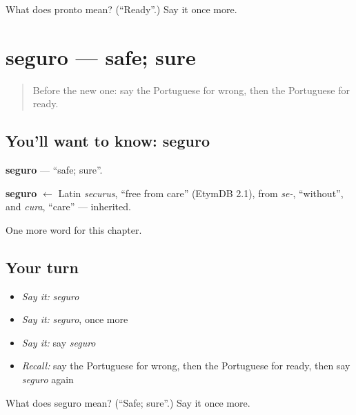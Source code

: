 \begin{tcolorbox}[breakable,colback=teal!4,colframe=teal!35!black,title={Before you move on}]
What does pronto mean? (\textquotedblleft{}Ready\textquotedblright{}.) Say it once more.
\end{tcolorbox}
\section[seguro]{seguro — safe; sure}

\label{lesson:PT-C125-seguro}



\begin{quote}
Before the new one: say the Portuguese for wrong, then the Portuguese for ready.
\end{quote}

\subsection*{You'll want to know: seguro}
\textbf{seguro} — \textquotedblleft{}safe; sure\textquotedblright{}.

\begin{cousinweb}
\textbf{seguro} $\leftarrow$ Latin \emph{securus}, \textquotedblleft{}free from care\textquotedblright{} (EtymDB 2.1), from \emph{se-}, \textquotedblleft{}without\textquotedblright{}, and \emph{cura}, \textquotedblleft{}care\textquotedblright{} — inherited.
\end{cousinweb}

\begin{grammarlens}[title={What you've built}]
One more word for this chapter.
\end{grammarlens}

\subsection*{Your turn}
\begin{itemize}
\raggedright
  \item \emph{Say it:} \emph{seguro}
  \item \emph{Say it:} \emph{seguro}, once more
  \item \emph{Say it:} say \emph{seguro}
  \item \emph{Recall:} say the Portuguese for wrong, then the Portuguese for ready, then say \emph{seguro} again
\end{itemize}

\begin{tcolorbox}[breakable,colback=teal!4,colframe=teal!35!black,title={Before you move on}]
What does seguro mean? (\textquotedblleft{}Safe; sure\textquotedblright{}.) Say it once more.
\end{tcolorbox}

